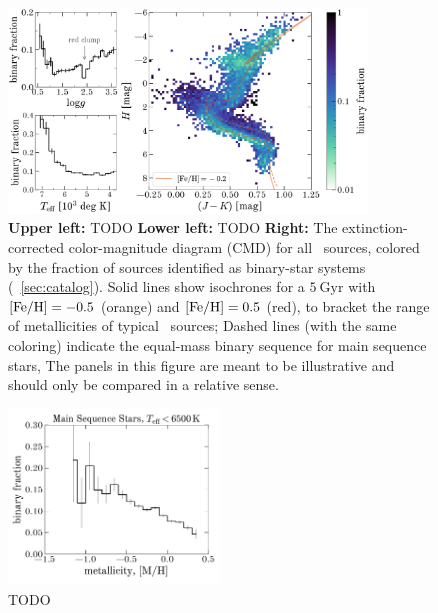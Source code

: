 \documentclass[modern]{aastex63}
\begin{document}
\begin{figure}[!t]
    \begin{center}
    \includegraphics[width=0.85\textwidth]{binary-fraction.pdf}
    \end{center}
    \caption{%
    \textbf{Upper left:} TODO
    \textbf{Lower left:} TODO
    \textbf{Right:} The extinction-corrected  color-magnitude
    diagram (CMD) for all \apogee\ sources, colored by the fraction of sources
    identified as binary-star systems (\sectionname~\ref{sec:catalog}).
    Solid lines show  isochrones for a $5~\mathrm{Gyr}$ with
    ${[{\rm Fe}/{\rm H}]} = -0.5$ (orange) and ${[{\rm Fe}/{\rm H}]} = 0.5$ (red), to bracket the range of
    metallicities of typical \apogee\ sources; Dashed lines (with the same
    coloring) indicate the equal-mass binary sequence for main sequence stars,
    The panels in this figure are meant to be illustrative and should only be
    compared in a relative sense.
    \label{fig:binary-CMD}
    }
\end{figure}

\begin{figure}[!t]
    \begin{center}
    \includegraphics[width=0.5\textwidth]{fraction_M_H.pdf}
    \end{center}
    \caption{%
    TODO
    \label{fig:binfrac-mh}
    }
\end{figure}
\end{document}
